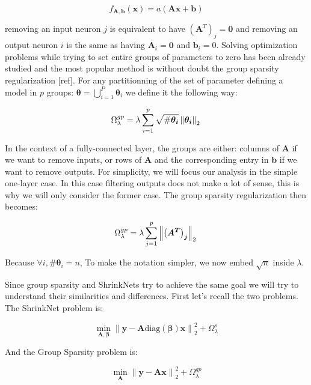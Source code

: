 \documentclass{article}
\newcommand{\norm}[1]{\left\lVert#1\right\rVert}
\newcommand{\diag}[1]{\text{diag}\left(#1\right)}
\begin{document}
\begin{equation} \label{fully_connected}
  f_{\bm{A}, \bm{b}}(\bm{x})=a(\bm{Ax + b})
\end{equation}

removing an input neuron $j$ is equivalent to have $\left(\bm{A}^T\right)_j = \bm{0}$
and removing an output neuron $i$ is the same as having $\bm{A}_i = \bm{0}$ and $\bm{b}_i = 0$. Solving  optimization problems while trying to set entire groups
of parameters to zero has been already studied and the most popular method
is without doubt the group sparsity regularization [ref]. For any partitionning of the set of parameter defining a model in $p$ groups: $\bm{\theta} = \bigcup_{i=1}^P \bm{\theta}_i$ we define it the following way:

\begin{equation}
  \Omega_\lambda^{gp} = \lambda \sum_{i=1}^p \sqrt{\#\bm{\theta_i}} \norm{\bm{\theta_i}}_2 \\
\end{equation}

In the context of a fully-connected layer, the groups are either: columns of $\bm{A}$ if we want to remove inputs, or rows of $\bm{A}$ and the corresponding entry in $\bm{b}$ if we want to remove outputs. For simplicity, we will focus our analysis in the simple one-layer case. In this case filtering outputs does not make a lot of sense, this is why we will only consider the former case. The group sparsity regularization then becomes:


\begin{equation} \label{group_sparsity_regularization}
  \Omega_\lambda^{gp} = \lambda \sum_{j=1}^p \norm{\bm{\left(A^T\right)_j}}_2 \\
\end{equation}

Because $\forall i, \#\bm{\theta}_i = n$, To make the notation simpler,
we now embed $\sqrt{n}$ inside $\lambda$.

Since group sparsity and ShrinkNets try to achieve the same goal we will try to understand their similarities and differences. First let's recall the two problems. The ShrinkNet problem is:

\begin{equation}
  \min_{\bm{A}, \bm{\beta}} \norm{\bm{y} - \bm{A}\diag{\bm{\beta}}\bm{x}}_2^2 + \Omega_\lambda^s
\end{equation}

And the Group Sparsity problem is:

\begin{equation}
  \min_{\bm{A}} \norm{\bm{y} - \bm{A}\bm{x}}_2^2 + \Omega_\lambda^{gp}
\end{equation}
\end{document}
